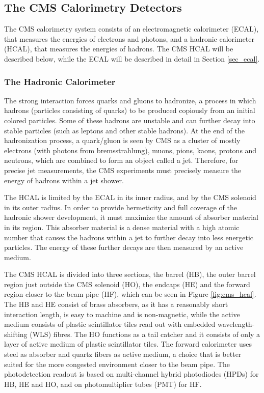 \subsection{The CMS Calorimetry Detectors}

The CMS calorimetry system consists of an electromagnetic calorimeter (ECAL), that measures the energies of electrons and photons, and a hadronic calorimeter (HCAL), that measures the energies of hadrons. 
The CMS HCAL will be described below, while the ECAL will be described in detail in Section \ref{sec_ecal}.

\subsubsection{The Hadronic Calorimeter}

The strong interaction forces quarks and gluons to hadronize, a process in which hadrons (particles consisting of quarks) to be produced copiously from an initial colored particles. Some of these hadrons are unstable and can further decay into stable particles (such as leptons and other stable hadrons). 
At the end of the hadronization process, a quark/gluon is seen by CMS as a cluster of mostly electrons (with photons from bremsstrahlung), muons, pions, kaons, protons and neutrons, which are combined to form an object called a jet. 
Therefore, for precise jet measurements, the CMS experiments must precisely measure the energy of hadrons within a jet shower. 

The HCAL is limited by the ECAL in its inner radius, and by the CMS solenoid in its outer radius. 
In order to provide hermeticity and full coverage of the hadronic shower development, it must maximize the amount of absorber material in its region. 
This absorber material is a dense material with a high atomic number that causes the hadrons within a jet to further decay into less energetic particles.
The energy of these further decays are then measured by an active medium. 

The CMS HCAL is divided into three sections, the barrel (HB), the outer barrel region just outside the CMS solenoid (HO), the endcaps (HE) and the forward region closer to the beam pipe (HF), which can be seen in Figure \ref{fig:cms_hcal}. 
The HB and HE consist of brass absorbers, as it has a reasonably short interaction length, is easy to machine and is non-magnetic, while the active medium consists of plastic scintillator tiles read out with embedded wavelength-shifting (WLS) fibres. 
The HO functions as a tail catcher and it consists of only a layer of active medium of plastic scintillator tiles. 
The forward calorimeter uses steel as absorber  and quartz fibers as active medium, a choice that is better suited for the more congested environment closer to the beam pipe. 
The photodetection readout is based on multi-channel hybrid photodiodes (HPDs) for HB, HE and HO, and on photomultiplier tubes (PMT) for HF.

